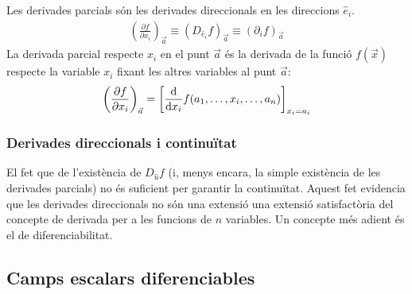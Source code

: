 \begin{defi}
    Les derivades parcials són les derivades direccionals en les direccions $\hat{e}_{i}$.
    \begin{align}
        \left( \frac{\partial f}{\partial x_{i}} \right)_{\vec{a}} \equiv (D_{\hat{e}_{i}} f)_{\vec{a}} \equiv (\partial_{i} f)_{\vec{a}}
    \end{align}
    La derivada parcial respecte $x_{i}$ en el punt $\vec{a}$ és la derivada de la funció $f(\vec{x})$ respecte la variable $x_{i}$ fixant les altres variables al punt $\vec{a}$:
    \begin{align}
        \left( \frac{\partial f}{\partial x_{i}} \right)_{\vec{a}} = \left[ \frac{\mathrm{d}}{\mathrm{d} x_{i}} f(a_{1}, \dots , x_{i}, \dots , a_{n}) \right]_{x_{i}=a_{i}}
    \end{align}
\end{defi}

\subsubsection*{Derivades direccionals i continuïtat}
El fet que de l'existència de $D_{\hat{u}}f$ (i, menys encara, la simple existència de les derivades parcials) no és suficient per garantir la continuïtat. Aquest fet evidencia que les derivades direccionals no són una extensió una extensió satisfactòria del concepte de derivada per a les funcions de $n$ variables. Un concepte més adient és el de diferenciabilitat.

\subsection{Camps escalars diferenciables}
